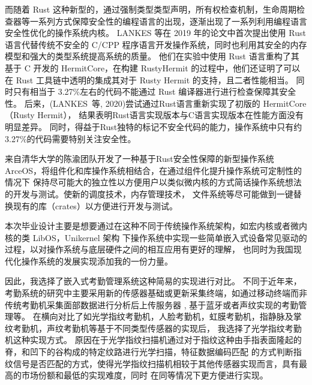     而随着 Rust 这种新型的，通过强制类型类型声明，所有权检查机制，生命周期检查器等一系列方式保障安全性的编程语言的出现，逐渐出现了一系列利用编程语言安全性优化的操作系统内核。
    LANKES 等在 2019 年的论文中首次提出使用 Rust 语言代替传统不安全的 C/CPP 程序语言开发操作系统，同时也利用其安全的内存模型和强大的类型系统提高系统的质量。
    他们在实验中使用 Rust 语言重构了其基于 C 开发的 HermitCore，在构建 RustyHermit 的过程中，他们还证明了可以在 Rust 工具链中透明的集成其对于 Rusty Hermit 的支持，且二者性能相当。
    同时只有相当于 3.27\%左右的代码不能通过 Rust 编译器进行进行检查保障其安全性。
    \cite{lankes_exploring_2019, lankes_rustyhermit_2020}
    后来，(LANKES 等, 2020)尝试通过Rust语言重新实现了初版的 HermitCore（Rusty Hermit），
    结果表明Rust语言实现版本与C语言实现版本在性能方面没有明显差异。
    同时，得益于Rust独特的标记不安全代码的能力，操作系统中只有约3.27\%的代码需要特别关注安全性。


    来自清华大学的陈渝团队开发了一种基于Rust安全性保障的新型操作系统ArceOS，将组件化和库操作系统相结合，在通过组件化提升操作系统可定制性的情况下
    保持尽可能大的独立性以方便用户以类似微内核的方式简话操作系统想法的开发与测试。使新的调度技术，内存管理技术，
    文件系统等尽可能做到一键替换现有的库（crates）以方便进行开发与测试。

    本次毕业设计主要是想要通过在这种不同于传统操作系统架构，如宏内核或者微内核的类 LibOS，Unikernel 架构
    下操作系统中实现一些简单嵌入式设备常见驱动的过程，以对操作系统与底层硬件之间的相互应用有更好的理解，
    也同时为我国现代化操作系统的发展实现添加我的一份力量。

    因此，我选择了嵌入式考勤管理系统这种简易的实现进行对比。
    不同于近年来，考勤系统的研究中主要采用新的传感器基础或更新采集终端，如通过移动终端而非传统考勤机采集面部数据进行分析后上传服务器
    \cite{一种基于体征数据的考勤管理系统},
    基于蓝牙或者声纹实现的考勤管理等。
    \cite{一种基于体征数据的考勤管理系统, 李龙杰_2024_基于树莓派和声纹识别算法的课堂考勤系统, 一种基于蓝牙的无感考勤方法及系统}
    在横向对比了如光学指纹考勤机，人脸考勤机，虹膜考勤机，指静脉及掌纹考勤机，声纹考勤机等基于不同类型传感器的实现后，
    \cite{兰昊_2016_考勤系统现状综述}我选择了光学指纹考勤机这种实现方式。
    原因在于光学指纹扫描机通过对于指纹这种由手指表面隆起的脊，和凹下的谷构成的特定纹路进行光学扫描，特征数据编码匹配
    的方式判断指纹信号是否匹配的方式，使得光学指纹扫描机相较于其他传感器实现而言，具有最高的市场份额和最低的实现难度，同时
    在同等情况下更方便进行实现。
    \cite{李兴春_2007_指纹考勤系统研究}

